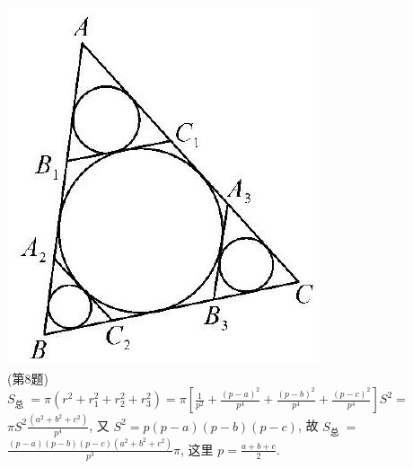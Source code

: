 \documentclass[10pt]{article}
\begin{document}
\includegraphics[max width=\textwidth, center]{2024_10_30_66b8e5e701da2093c133g-086(1)}\\
(第8题)\\
$S_{\text {总 }}=\pi\left(r^{2}+r_{1}^{2}+r_{2}^{2}+r_{3}^{2}\right)=\pi\left[\frac{1}{p^{2}}+\frac{(p-a)^{2}}{p^{4}}+\frac{(p-b)^{2}}{p^{4}}+\frac{(p-c)^{2}}{p^{4}}\right] S^{2}=$ $\pi S^{2} \frac{\left(a^{2}+b^{2}+c^{2}\right)}{p^{4}}$, 又 $S^{2}=p(p-a)(p-b)(p-c)$, 故 $S_{\text {总 }}=$ $\frac{(p-a)(p-b)(p-c)\left(a^{2}+b^{2}+c^{2}\right)}{p^{3}} \pi$, 这里 $p=\frac{a+b+c}{2}$.
\end{document}
